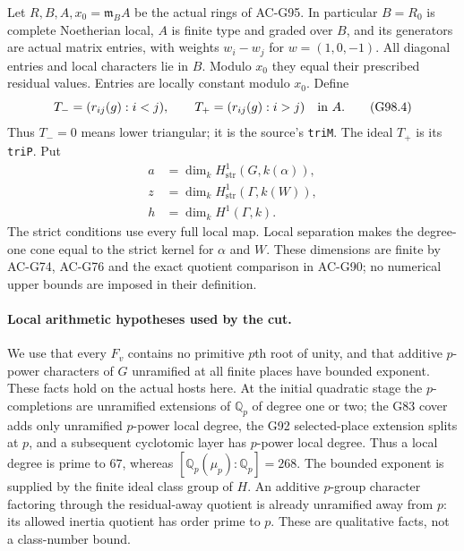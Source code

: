 Let $R,B,A,x_0=\mathfrak m_BA$ be the actual rings of AC-G95.
In particular $B=R_0$ is complete Noetherian local, $A$ is finite
type and graded over $B$, and its generators are actual matrix
entries, with weights $w_i-w_j$ for $w=(1,0,-1)$.
All diagonal entries and local characters lie in $B$.
Modulo $x_0$ they equal their prescribed residual values.
Entries are locally constant modulo $x_0$.
Define
\[
 T_-=(r_{ij}(g):i<j),\qquad T_+=(r_{ij}(g):i>j)
           \quad\hbox{in }A.
 \tag{G98.4}
\]
Thus $T_-=0$ means lower triangular; it is the source's
\texttt{triM}.  The ideal $T_+$ is its \texttt{triP}.
Put
\[
 \begin{split}
 a&=\dim_k H^1_{\mathrm{str}}(G,k(\alpha)),\\
 z&=\dim_k H^1_{\mathrm{str}}(\Gamma,k(W)),\\
 h&=\dim_k H^1(\Gamma,k).
 \end{split}
 \tag{G98.5}
\]
The strict conditions use every full local map.  Local separation
makes the degree-one cone equal to the strict kernel for $\alpha$
and $W$.  These dimensions are finite by AC-G74, AC-G76 and the
exact quotient comparison in AC-G90; no numerical upper bounds
are imposed in their definition.

\paragraph{Local arithmetic hypotheses used by the cut.}
We use that every $F_v$ contains no primitive $p$th root of unity,
and that additive $p$-power characters of $G$ unramified at all
finite places have bounded exponent.  These facts hold on the
actual hosts here.  At the initial quadratic stage the $p$-completions
are unramified extensions of $\mathbb Q_p$ of degree one or two;
the G83 cover adds only unramified $p$-power local degree, the G92
selected-place extension splits at $p$, and a subsequent
cyclotomic layer has $p$-power local degree.  Thus a local degree
is prime to $67$, whereas $[\mathbb Q_p(\mu_p):\mathbb Q_p]=268$.
The bounded exponent is supplied by the finite ideal class group
of $H$.  An additive $p$-group character factoring through the
residual-away quotient is already unramified away from $p$:
its allowed inertia quotient has order prime to $p$.
These are qualitative facts, not a class-number bound.

